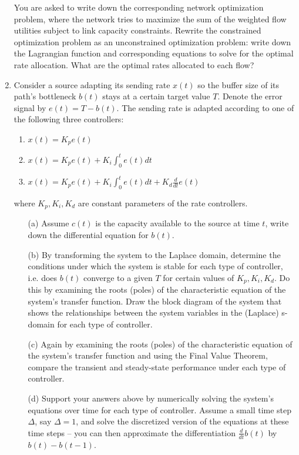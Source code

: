 \documentclass{article}
\begin{document}
\begin{enumerate}
You are asked to write down the corresponding network optimization problem, where the network tries to maximize the sum of the weighted flow utilities subject to link capacity constraints.  Rewrite the constrained optimization problem as an unconstrained optimization problem: write down the Lagrangian function and corresponding equations to solve for the optimal rate allocation. What are the optimal rates allocated to each flow? 


\item Consider a source adapting its sending rate $x(t)$ so the buffer size of  its path's bottleneck $b(t)$ stays at a certain target value $T$. Denote the error signal by  $e(t) = T-b(t)$. The sending rate is adapted according to one of the following three controllers:
\begin{enumerate}
\item $x(t)=K_p  e(t)$   

\item $x(t)= K_p  e(t)+ K_i \int_0^t e(t)dt$ 

\item $x(t)= K_p  e(t)+ K_i \int_0^t e(t)dt+ K_d  \frac{d}{dt} e(t)$  
\end{enumerate}
where  $K_p, K_i, K_d$   are constant parameters of the rate controllers.

\begin{itemize}
\item[(a)] Assume $c(t)$ is the capacity available to the source at time $t$, write down the differential equation for $b(t)$.

\item[(b)] By transforming the system to the Laplace domain, determine the conditions under which the system is stable for each type of controller, i.e. does $b(t)$ converge to a given $T$ for certain values of $K_p, K_i, K_d$. Do this by examining the roots (poles) of the characteristic equation of the system's transfer function. Draw the block diagram of the system that shows the relationships between the system variables in the (Laplace) s-domain for each type of controller.

\item[(c)] Again by examining the roots (poles) of the characteristic equation of the system's transfer function and using the Final Value Theorem, compare the transient and steady-state performance under each type of controller.

\item[(d)] Support your answers above by numerically solving the system's equations over time for each type of controller. Assume a small time step $\Delta$, say $\Delta=1$, and solve the discretized version of the equations at these time steps -- you can then approximate the differentiation $\frac{d}{dt} b(t)$ by $b(t)-b(t-1)$.
\end{itemize}



\end{enumerate}
\end{document}
